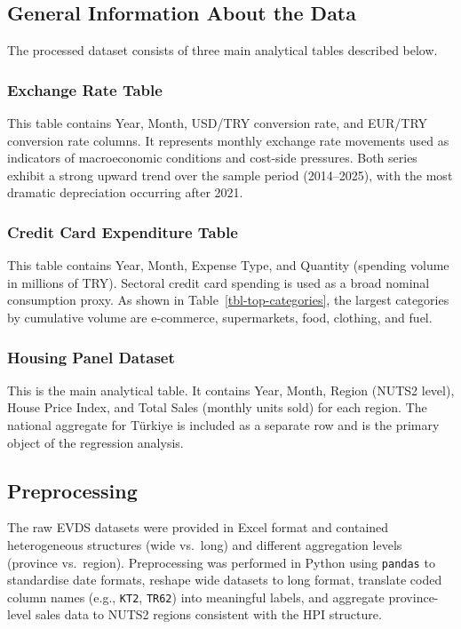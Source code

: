 \documentclass[
  11pt,
  a4paper,
]{article}
\begin{document}
\subsection{General Information About the
Data}\label{general-information-about-the-data}

The processed dataset consists of three main analytical tables described
below.

\subsubsection{Exchange Rate Table}\label{exchange-rate-table}

This table contains Year, Month, USD/TRY conversion rate, and EUR/TRY
conversion rate columns. It represents monthly exchange rate movements
used as indicators of macroeconomic conditions and cost-side pressures.
Both series exhibit a strong upward trend over the sample period
(2014--2025), with the most dramatic depreciation occurring after 2021.

\subsubsection{Credit Card Expenditure
Table}\label{credit-card-expenditure-table}

This table contains Year, Month, Expense Type, and Quantity (spending
volume in millions of TRY). Sectoral credit card spending is used as a
broad nominal consumption proxy. As shown in
Table~\ref{tbl-top-categories}, the largest categories by cumulative
volume are e-commerce, supermarkets, food, clothing, and fuel.

\subsubsection{Housing Panel Dataset}\label{housing-panel-dataset}

This is the main analytical table. It contains Year, Month, Region
(NUTS2 level), House Price Index, and Total Sales (monthly units sold)
for each region. The national aggregate for Türkiye is included as a
separate row and is the primary object of the regression analysis.

\subsection{Preprocessing}\label{preprocessing}

The raw EVDS datasets were provided in Excel format and contained
heterogeneous structures (wide vs.~long) and different aggregation
levels (province vs.~region). Preprocessing was performed in Python
using \texttt{pandas} to standardise date formats, reshape wide datasets
to long format, translate coded column names (e.g., \texttt{KT2},
\texttt{TR62}) into meaningful labels, and aggregate province-level
sales data to NUTS2 regions consistent with the HPI structure.
\end{document}
